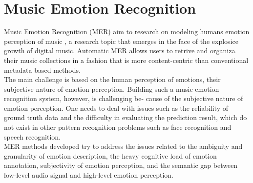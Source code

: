 \section{Music Emotion Recognition}
Music Emotion Recognition (MER) aim to research on modeling humans emotion perception of music \cite{yang2011music}, a research topic that emerges in the face of the explosice growth of digital music.
Automatic MER allows users to retrive and organiza their music collections in a fashion that is more content-centric than conventional metadata-based methods.
\\
The main challenge is based on the human perception of emotions, their subjective nature of emotion perception. 
Building such a music emotion recognition system, however, is challenging be- cause of the subjective nature of emotion perception. One needs to deal with issues such as the reliability of ground truth data and the difficulty in evaluating the prediction result, which do not exist in other pattern recognition problems such as face recognition and speech recognition. 
\\
MER methods developed try to address the issues related to the ambiguity and granularity of emotion description, the heavy cognitive load of emotion annotation, subjectivity of emotion perception, and the semantic gap between low-level audio signal and high-level emotion perception.

